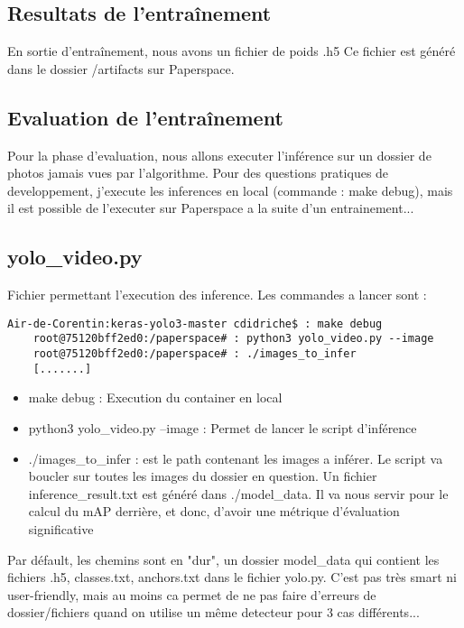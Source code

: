 \subsection{Resultats de l'entraînement}

En sortie d'entraînement, nous avons un fichier de poids .h5
Ce fichier est généré dans le dossier /artifacts sur Paperspace.

\subsection{Evaluation de l'entraînement}

Pour la phase d'evaluation, nous allons executer l'inférence sur un dossier de photos jamais vues par l'algorithme.
Pour des questions pratiques de developpement, j'execute les inferences en local (commande : make debug), mais il est possible de l'executer sur Paperspace a la suite d'un entrainement...

\subsection{yolo_video.py}

Fichier permettant l'execution des inference. Les commandes a lancer sont :
\begin{lstlisting}[style=console]
    Air-de-Corentin:keras-yolo3-master cdidriche$ : make debug
    root@75120bff2ed0:/paperspace# : python3 yolo_video.py --image
    root@75120bff2ed0:/paperspace# : ./images_to_infer
    [.......]
\end{lstlisting}

\begin{itemize}
    \item make debug : Execution du container en local
    \item python3 yolo_video.py --image : Permet de lancer le script d'inférence
    \item ./images_to_infer : est le path contenant les images a inférer. Le script va boucler sur toutes les images du dossier en question. Un fichier inference_result.txt est généré dans ./model_data. Il va nous servir pour le calcul du mAP derrière, et donc, d'avoir une métrique d'évaluation significative
\end{itemize}

Par défault, les chemins sont en "dur", un dossier model_data qui contient les fichiers .h5, classes.txt, anchors.txt dans le fichier yolo.py.
C'est pas très smart ni user-friendly, mais au moins ca permet de ne pas faire d'erreurs de dossier/fichiers quand on utilise un même detecteur pour 3 cas différents...

